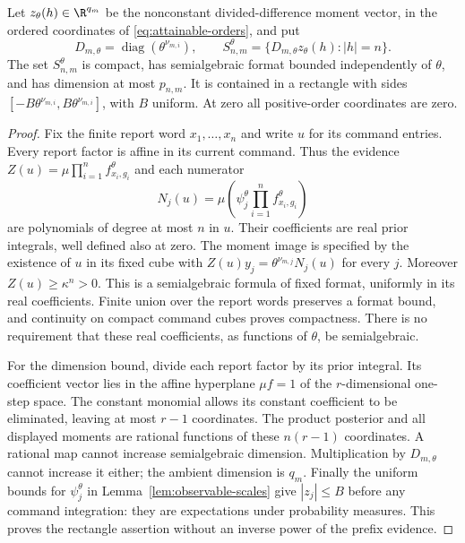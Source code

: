\begin{lemma}\label{lem:attainable-format}
Let $z_\theta(h)\in\R^{q_m}$ be the nonconstant divided-difference
moment vector, in the ordered coordinates of
\eqref{eq:attainable-orders}, and put
\[
 D_{m,\theta}=\operatorname{diag}(\theta^{\nu_{m,i}}),\qquad
 S_{n,m}^\theta=\{D_{m,\theta}z_\theta(h):|h|=n\}.
\]
The set $S_{n,m}^\theta$ is compact, has semialgebraic format bounded
independently of $\theta$, and has dimension at most $p_{n,m}$.
It is contained in a rectangle with sides
$[-B\theta^{\nu_{m,i}},B\theta^{\nu_{m,i}}]$, with $B$ uniform.
At zero all positive-order coordinates are zero.
\end{lemma}
\begin{proof}
Fix the finite report word $x_1,\ldots,x_n$ and write $u$ for its
command entries. Every report factor is affine in its current command.
Thus the evidence
$Z(u)=\mu\prod_{i=1}^n f_{x_i,g_i}^\theta$ and each numerator
\[
 N_j(u)=\mu\left(\psi_j^\theta
                   \prod_{i=1}^n f_{x_i,g_i}^\theta\right)
\]
are polynomials of degree at most $n$ in $u$. Their coefficients are
real prior integrals, well defined also at zero. The moment image is
specified by the existence of $u$ in its fixed cube with
$Z(u)y_j=\theta^{\nu_{m,j}}N_j(u)$ for every $j$.
Moreover $Z(u)\ge\kappa^n>0$. This is a semialgebraic formula of
fixed format, uniformly in its real coefficients. Finite union over the
report words preserves a format bound, and continuity on compact command
cubes proves compactness. There is no requirement that these real
coefficients, as functions of $\theta$, be semialgebraic.

For the dimension bound, divide each report factor by its prior
integral. Its coefficient vector lies in the affine hyperplane
$\mu f=1$ of the $r$-dimensional one-step space. The constant monomial
allows its constant coefficient to be eliminated, leaving at most $r-1$
coordinates. The product posterior and all displayed moments are rational
functions of these $n(r-1)$ coordinates. A rational map cannot increase
semialgebraic dimension. Multiplication by $D_{m,\theta}$ cannot increase
it either; the ambient dimension is $q_m$. Finally the uniform bounds
for $\psi_j^\theta$ in Lemma~\ref{lem:observable-scales} give
$|z_j|\le B$ before any command integration: they are expectations under
probability measures. This proves the rectangle assertion without an
inverse power of the prefix evidence.
\end{proof}

